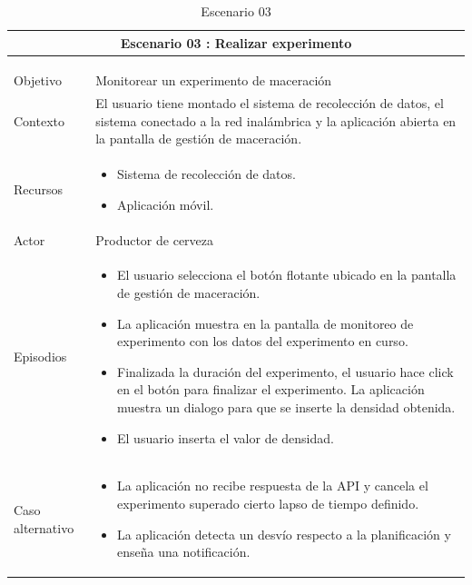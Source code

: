 \begin{longtable}{|p{2cm}|p{12cm}|}
    \hline
    \multicolumn{2}{|c|}{ Escenario 03 : Realizar experimento} \\
    \hline
    \hline
    \endfirsthead
    
    \hline
    \caption{Escenario 03}\\
    \endfoot
    
    \hline
    \multicolumn{2}{|c|}{Continuación de la Tabla \ref{tab:TablaEscenario03}}\\
    \hline
    \hline
    \endhead
    
    \hline
    \caption{Escenario 03 \label{tab:TablaEscenario03}}\\
    \endlastfoot


    Objetivo
    & Monitorear un experimento de maceración \\
    \hline
    
    Contexto
    & El usuario tiene montado el sistema de recolección de datos, el sistema conectado a la red inalámbrica y la aplicación abierta en la pantalla de gestión de maceración.
    \\
    \hline
    
    Recursos
    &
    \begin{itemize}
        \item Sistema de recolección de datos.
        \item Aplicación móvil.
    \end{itemize} 
    \\
    \hline
    
    Actor
    & Productor de cerveza
    \\
    \hline
    
    Episodios
    & \begin{itemize}
        \item El usuario selecciona el botón flotante ubicado en la pantalla de gestión de maceración.
        \item La aplicación muestra en la pantalla de monitoreo de experimento con los datos del experimento en curso.
        \item Finalizada la duración del experimento, el usuario hace click en el botón para finalizar el experimento. La aplicación muestra un dialogo para que se inserte la densidad obtenida.
        \item El usuario inserta el valor de densidad.
    \end{itemize}
    \\
    \hline
    
    Caso alternativo
    & \begin{itemize}
        \item La aplicación no recibe respuesta de la API y cancela el experimento superado cierto lapso de tiempo definido.
        \item La aplicación detecta un desvío respecto a la planificación y enseña una notificación.
    \end{itemize}
    \\
    \hline
\end{longtable}

